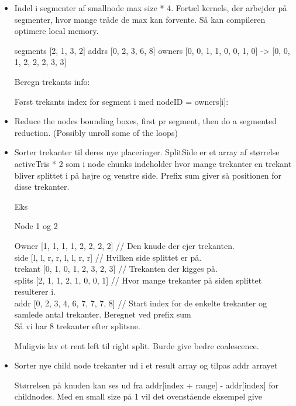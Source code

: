 \begin{itemize}
\item
Indel i segmenter af smallnode max size * 4. Fortæl kernels, der
arbejder på segmenter, hvor mange tråde de max kan forvente. Så kan
compileren optimere local memory.

segments [2, 1, 3, 2]
addrs    [0, 2, 3, 6, 8]
owners   [0, 0, 1, 1, 0, 0, 1, 0] -> [0, 0, 1, 2, 2, 2, 3, 3]

Beregn trekants info:

Først trekants index for segment i med nodeID = owners[i]:



\item
Reduce the nodes bounding boxes, first pr segment, then do a segmented
reduction. (Possibly unroll some of the loops)

\item
Sorter trekanter til deres nye placeringer. SplitSide er et array af
størrelse activeTris * 2 som i node chunks indeholder hvor mange
trekanter en trekant bliver splittet i på højre og venstre
side. Prefix sum giver så positionen for disse trekanter.

Eks

Node 1 og 2

Owner     [1, 1, 1, 1, 2, 2, 2, 2] // Den knude der ejer trekanten.\\
side      [l, l, r, r, l, l, r, r] // Hvilken side splittet er på.\\
trekant   [0, 1, 0, 1, 2, 3, 2, 3] // Trekanten der kigges på.\\
splits    [2, 1, 1, 2, 1, 0, 0, 1] // Hvor mange trekanter på siden splittet resulterer i.\\
addr      [0, 2, 3, 4, 6, 7, 7, 7, 8] // Start index for de enkelte trekanter og samlede antal trekanter. Beregnet ved prefix sum\\

Så vi har 8 trekanter efter splitsne.

Muligvis lav et rent left til right split. Burde give bedre coalescence.

\item
Sorter nye child node trekanter ud i et result array og tilpas addr arrayet

Størrelsen på knuden kan ses ud fra addr[index + range] - addr[index]
for childnodes. Med en small size på 1 vil det ovenstående eksempel give


\end{itemize}
